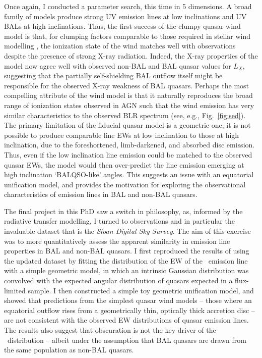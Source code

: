Once again, I conducted a parameter search, this time in 5 dimensions. 
A broad family of models produce strong UV emission lines at low inclinations
and UV BALs at high inclinations. 
Thus, the first success of the clumpy quasar wind model is that,
for clumping factors comparable to those required 
in stellar wind modelling \citep{hamann2008}, the ionization
state of the wind matches well with observations despite the presence
of strong X-ray radiation. Indeed, the X-ray properties of the model now 
agree well with observed non-BAL and BAL quasar values for $L_X$, suggesting
that the partially self-shielding BAL outflow itself might be responsible 
for the observed X-ray weakness of BAL quasars. Perhaps the most
compelling attribute of the wind model is that it naturally reproduces
the broad range of ionization states observed in AGN such that the wind 
emission has very similar characteristics to the observed BLR spectrum 
(see, e.g., Fig.~\ref{fig:sed}). The primary limitation of the fiducial
quasar model is a geometric one; it is not possible to produce comparable
line EWs at low inclination to those at high inclination, due to the
foreshortened, limb-darkened, and absorbed disc emission. Thus, even 
if the low inclination line emission could be matched to the observed quasar EWs,
the model would then over-predict the line emission emerging at high inclination
`BALQSO-like' angles. This suggests an issue with an equatorial unification model,
and provides the motivation for exploring the observational
characteristics of emission lines in BAL and non-BAL quasars.

The final project in this PhD saw a switch in philosophy, as, informed
by the radiative transfer modelling, I turned to observations and in particular
the invaluable dataset that is the {\sl Sloan Digital Sky Survey}. 
The aim of this exercise was to more quantitatively assess the apparent
similarity in emission line properties in BAL and non-BAL quasars. I first
reproduced the results of \cite{risaliti2011} using the updated dataset 
by fitting the distribution of the EW of the \oiiifull\ emission line 
with a simple geometric model, in which an intrinsic Gaussian distribution
was convolved with the expected angular distribution of quasars expected in a 
flux-limited sample. I then constructed a simple toy geometric unification model,
and showed that predictions from the simplest quasar wind models -- 
those where an equatorial outflow rises from a geometrically thin, 
optically thick accretion disc -- are not consistent with the observed 
EW distributions of quasar emission lines. The results also suggest that
obscuration is not the key driver of the \ewo\ distribution -- albeit
under the assumption that BAL
quasars are drawn from the same population as non-BAL quasars.

